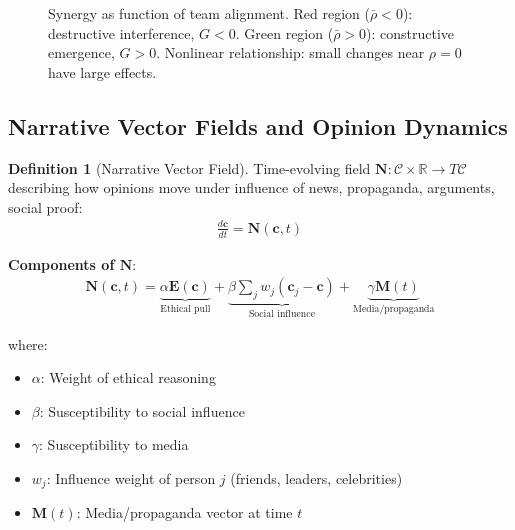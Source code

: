 \documentclass[11pt,a4paper]{article}
\theoremstyle{definition}
\newtheorem{definition}{Definition}[section]
\theoremstyle{remark}
\newcommand{\RR}{\mathbb{R}}
\newcommand{\CC}{\mathcal{C}}
\newcommand{\EE}{\mathbf{E}}
\newcommand{\cc}{\mathbf{c}}
\begin{document}
\begin{enumerate}
\begin{figure}[H]
\caption{Synergy as function of team alignment. Red region (\(\bar{\rho} < 0\)): destructive interference, \(G < 0\). Green region (\(\bar{\rho} > 0\)): constructive emergence, \(G > 0\). Nonlinear relationship: small changes near \(\rho = 0\) have large effects.}
\label{fig:synergy_landscape}
\end{figure}

\subsection{Narrative Vector Fields and Opinion Dynamics}

\begin{definition}[Narrative Vector Field]
Time-evolving field \(\mathbf{N}: \CC \times \RR \to T\CC\) describing how opinions move under influence of news, propaganda, arguments, social proof:
\begin{align}
\frac{d\cc}{dt} = \mathbf{N}(\cc, t)
\end{align}

\textbf{Components of \(\mathbf{N}\)}:
\begin{align}
\mathbf{N}(\cc, t) = \underbrace{\alpha \EE(\cc)}_{\text{Ethical pull}} + \underbrace{\beta \sum_j w_j (\cc_j - \cc)}_{\text{Social influence}} + \underbrace{\gamma \mathbf{M}(t)}_{\text{Media/propaganda}}
\end{align}

where:
\begin{itemize}
    \item \(\alpha\): Weight of ethical reasoning
    \item \(\beta\): Susceptibility to social influence
    \item \(\gamma\): Susceptibility to media
    \item \(w_j\): Influence weight of person \(j\) (friends, leaders, celebrities)
    \item \(\mathbf{M}(t)\): Media/propaganda vector at time \(t\)
\end{itemize}
\end{definition}


\end{enumerate}
\end{document}
